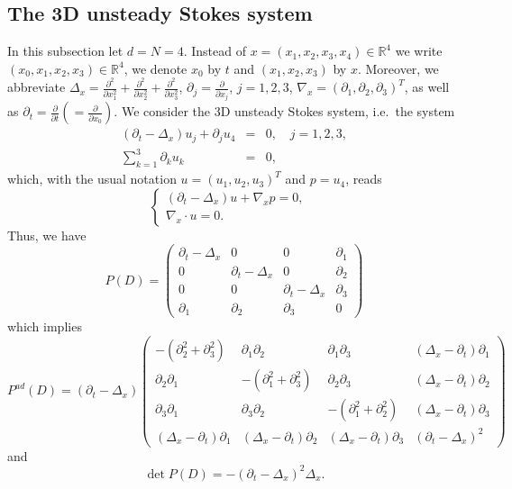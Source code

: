\documentclass[a4paper,10pt]{amsart}
\newtheorem*{crucial lemma}{Lemma \ref{lem:nice polynomial2}}
\theoremstyle{definition}
\newcommand{\R}{\mathbb{R}}
\newcommand{\Pad}{P^{ad}}
\newcommand{\detP}{\operatorname{det}\!P}
\begin{document}
\subsection{The 3D unsteady Stokes system}\label{subsec:Unsteady Stokes}

In this subsection let $d=N=4$. Instead of $x=(x_1,x_2,x_3,x_4)\in\R^4$ we write $(x_0,x_1,x_2,x_3)\in\R^4$, we denote $x_0$ by $t$ and $(x_1,x_2,x_3)$ by $x$. Moreover, we abbreviate $\Delta_x=\frac{\partial^2}{\partial x_1^2}+ \frac{\partial^2}{\partial x_2^2}+\frac{\partial^2}{\partial x_3^2}$, $\partial_j=\frac{\partial}{\partial x_j}$, $j=1,2,3$, $\nabla_x=(\partial_1,\partial_2,\partial_3)^T$, as well as $\partial_t=\frac{\partial}{\partial t}(=\frac{\partial}{\partial x_0})$. We consider the 3D unsteady Stokes system, i.e.~the system
\begin{eqnarray*}
	\left(\partial_t-\Delta_x\right)u_j + \partial_j u_4&=&0,\quad j=1,2,3,\\
	\sum_{k=1}^3\partial_k u_k&=&0,
\end{eqnarray*}
which, with the usual notation $u=(u_1,u_2,u_3)^T$ and $p=u_4$, reads
\begin{equation}\label{eq:Stokes system}
	\begin{cases}
 		\left(\partial_t-\Delta_x\right)u + \nabla_x p=0,&\\
 		\nabla_x\cdot u=0.&
	\end{cases}
\end{equation}
Thus, we have
\begin{equation}\label{eq:Stokes matrix}
	P(D)=\begin{pmatrix}
	\partial_t-\Delta_x & 0 & 0 & \partial_1\\
	0 & \partial_t-\Delta_x & 0 & \partial_2\\
	0 & 0 & \partial_t-\Delta_x & \partial_3\\
	\partial_1 & \partial_2 & \partial_3 & 0
\end{pmatrix}
\end{equation}
which implies
\[\Pad(D)=(\partial_t-\Delta_x)\begin{pmatrix}
	-(\partial_2^2+\partial_3^2) & \partial_1\partial_2 & \partial_1\partial_3 & (\Delta_x-\partial_t)\partial_1 \\ 
	\partial_2\partial_1 &-(\partial_1^2+\partial_3^2) &  \partial_2\partial_3 & (\Delta_x-\partial_t)\partial_2\\
 	\partial_3\partial_1 &  \partial_3\partial_2 &-(\partial_1^2+\partial_2^2) & (\Delta_x-\partial_t)\partial_3\\
 	(\Delta_x-\partial_t)\partial_1 & (\Delta_x-\partial_t)\partial_2  & (\Delta_x-\partial_t)\partial_3 & (\partial_t-\Delta_x)^2
\end{pmatrix}\]
and
\begin{equation}\label{eq:det Stokes}
	\detP(D)=-(\partial_t-\Delta_x)^2\Delta_x.
\end{equation}
 
\end{document}
